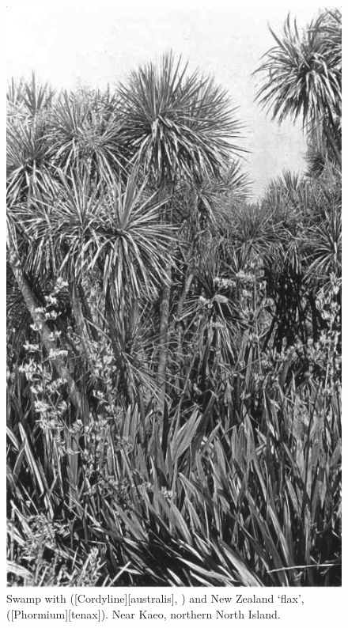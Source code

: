 \begin{figure}[t]
	\begin{minipage}[t]{\textwidth}
		\begin{minipage}[t]{(\textwidth-\fgap) * \real{0.395}}
			\centering
			\includegraphics[width=\textwidth]{graphics/fig_066}
			\caption[Swamp with cabbage trees]{Swamp with  ([Cordyline][australis], ) and New Zealand `flax',  ([Phormium][tenax]). Near Kaeo, northern North Island.
}
\end{minipage}
\end{minipage}
\end{figure}
